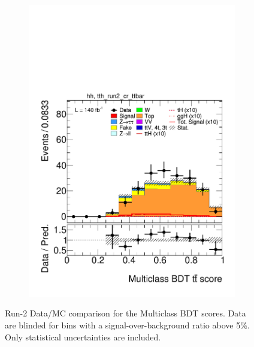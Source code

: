 \begin{figure}[htbp]
\begin{subfigure}[b]{0.49\textwidth}
  \end{subfigure}
  \hfill
  \begin{subfigure}[b]{0.49\textwidth}
    \centering
    \includegraphics[width=\textwidth]{images/plots_modelling_run2_run3_variables/run_2_tth/plot_tth_th_multiclass_ttbar_hh_tth_run2_cr_ttbar_15_16_17_18.pdf}
    \caption{}

  \end{subfigure}

  \caption{Run-2 Data/MC comparison for the Multiclass BDT scores. Data are blinded for bins with a signal-over-background ratio above 5\%. Only statistical uncertainties are included.}
  \label{scores_modelling_2}
\end{figure}

